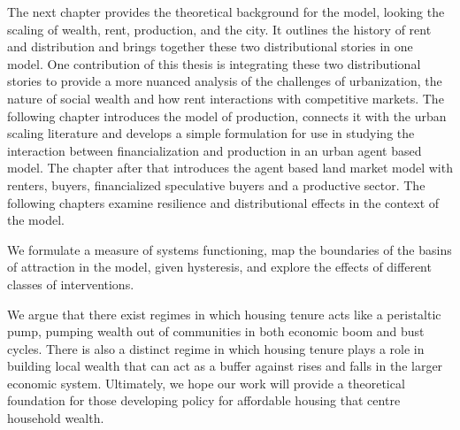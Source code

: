 The next chapter provides the theoretical background for the model, looking the scaling of wealth, rent, production, and the city. 
It outlines the history of rent and distribution and brings together these two distributional stories in one model.  One contribution of this thesis is integrating these two distributional stories to provide a more nuanced analysis of the challenges of urbanization, the nature of social wealth and how rent interactions with competitive markets. %
The following chapter introduces the model of production, connects it with the urban scaling literature and develops a simple formulation for use in studying the interaction between financialization and production in an urban agent based model.
The chapter after that introduces the agent based land market model with renters, buyers, financialized speculative buyers and a productive sector. 
The following chapters examine resilience and distributional effects in the context of the model. %

We formulate a measure of systems functioning, map the boundaries of the basins of attraction in the model, given hysteresis, and explore the effects of different classes of interventions. %

We argue that there exist regimes in which housing tenure acts like a peristaltic pump, pumping wealth out of communities in both economic boom and bust cycles. There is also a distinct regime in which housing tenure plays a role in building local wealth that can act as a buffer against rises and falls in the larger economic system. Ultimately, we hope our work will provide a theoretical foundation for those %
developing policy for affordable housing that centre household wealth. 

